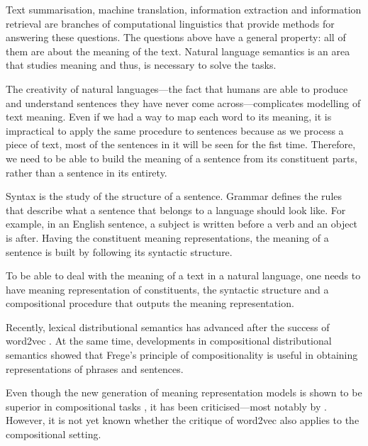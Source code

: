 Text summarisation, machine translation, information extraction and information
retrieval are branches of computational linguistics that provide methods for
answering these questions. The questions above have a general property: all of
them are about the meaning of the text. Natural language semantics is an area that studies meaning and thus, is necessary to solve the tasks.

The creativity of natural languages---the fact that humans are able to produce
and understand sentences they have never come across---complicates modelling of
text meaning. Even if we had a way to map each word to its meaning, it is
impractical to apply the same procedure to sentences because as we process a
piece of text, most of the sentences in it will be seen for the fist time.
Therefore, we need to be able to build the meaning of a sentence from its
constituent parts, rather than a sentence in its entirety.

Syntax is the study of the structure of a sentence. Grammar defines the rules
that describe what a sentence that belongs to a language should look like. For
example, in an English sentence, a subject is written before a verb and an
object is after. Having the constituent meaning representations, the meaning of
a sentence is built by following its syntactic structure.

To be able to deal with the meaning of a text in a natural language, one needs to have meaning representation of constituents, the syntactic structure and a compositional procedure that outputs the meaning representation.

Recently, lexical distributional semantics \cite{BullinariaLevy2012,Bullinaria2007,Turney:2010:FMV:1861751.1861756} has advanced after the success of word2vec \cite{mikolov2013linguistic,mikolov2013distributed,mikolov2013efficient}. At the same time, developments in compositional distributional semantics \cite{mitchell2010composition,maillard-clark-grefenstette:2014:TTNLS,Grefenstette:2011:ESC:2145432.2145580,Grefenstette:2011:ETV:2140490.2140497,kartsadrqpl2014,fried-polajnar-clark:2015:ACL-IJCNLP} showed that Frege's principle of compositionality \cite{Janssen2001} is useful in obtaining representations of phrases and sentences.
%
%
%

Even though the new generation of meaning representation models is shown to be superior in compositional tasks \cite{milajevs-EtAl:2014:EMNLP2014}, it has been criticised---most notably by . However, it is not yet known whether the critique of word2vec also applies to the compositional setting.
%
%
%

